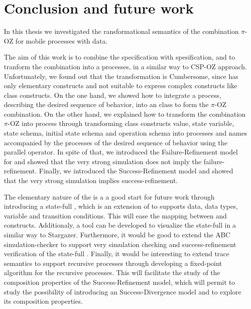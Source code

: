 \chapter{Conclusion and future work}
\label{sec_conclusion}
In this thesis we investigated the ransformational semantics of the combination $\pi$-OZ for mobile processes with data.

The aim of this work is to combine the \oz{} specification with \picalc{} spesification, and to tranform the combination into a \picalc{} processes, in a similar way to CSP-OZ \cite{olderog} approach. Unfortunately, we found out that the transformation is Cumbersome, since \picalc{} has only elementary constructs and not suitable to express complex constructs like \oz{} class constructs. On the one hand, we showed how to integrate a \picalc{} process, describing the desired sequence of behavior, into an \oz{} class to form the $\pi$-OZ combination. On the other hand, we explained how to transform the combination $\pi$-OZ into \picalc{} process through transforming \oz{} class constructs value, state variable, state schema, initial state schema and operation schema into \picalc{} processes and names accompanied by the processes of the desired sequence of behavior using the parallel operator. In spite of that, we introduced the Failure-Refinement model for \picalc{} and showed that the very strong simulation does not imply the failure-refinement. Finally, we introduced the Success-Refinement model and showed that the very strong simulation implies success-refinement. 

The elementary nature of the \picalc{} is a a good start for future work through introducing a state-full \picalc{}, which is an extension of \picalc{} to supports data, data types, variable and transition conditions. This will ease the mapping between \oz{} and \picalc{} constructs. Additionaly, a tool can be developed to visualize the state-full \picalc{} in a similar way to Stargazer\cite{stargazer}. Furthermore, it would be good to extend the ABC simulation-checker \cite{abc} to support very simulation checking and success-refinement verification of the state-full \picalc{}. Finally, it would be interesting to extend \cite{gieseking} trace semantics to support recursive processes through developing a fixed-point algorithm for the recursive processes. This will facilitate the study of the composition properties of the Success-Refinement model, which will permit to study the possibility of introducing an Success-Divergence model and to explore its composition properties.
